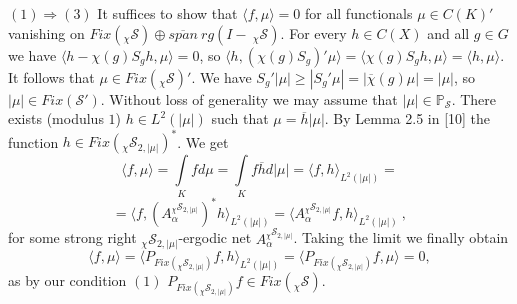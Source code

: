 \documentclass{amsart}
\theoremstyle{definition}
\theoremstyle{remark}
\numberwithin{equation}{section}
\newcommand{\bs}{\rightline{$\blacksquare$}}
\begin{document}
$(1) \Rightarrow (3)$ It suffices to show that $\langle f, \mu \rangle = 0 $ for all
functionals $\mu \in C(K)'$ vanishing on $Fix(_{\chi}\mathcal{S}) \oplus \overline{span}\ rg (I -\ _{\chi}\mathcal{S})$. For every $h \in C(X)$ and all $ g \in G$ we have
$\langle h - \chi(g)S_g h, \mu \rangle = 0$, so $\langle h, (\chi(g)S_g)'\mu \rangle = \langle \chi(g)S_g h, \mu \rangle = \langle h, \mu \rangle$. It follows that  $\mu \in Fix(_{\chi}\mathcal{S})'$. We have $S_g'|\mu| \geq |S_g'\mu| = |\overline{\chi}(g)\mu| = |\mu|$, so $|\mu| \in Fix(\mathcal{S}')$. Without loss of generality 
we may assume that $|\mu| \in \mathbb{P}_{\mathcal{S}}$. There exists (modulus $1$) $h \in L^2(|\mu|)$ 
such that $\mu = \overline{h}|\mu|$. By Lemma 2.5 in [10] the function $h \in Fix(_{\chi}\mathcal{S}_{2,|\mu|})^*$. We get
\[ \langle f, \mu \rangle = \int \limits_K f d\mu = \int \limits_K f \overline{h}d|\mu| = \langle f, h \rangle_{L^2(|\mu|)} = 
\]
\[ = \langle f, (A_{\alpha}^{_{\chi}\mathcal{S}_{2,|\mu|}} )^* h \rangle_{L^2(|\mu|)} = \langle A_{\alpha}^{_{\chi}\mathcal{S}_{2,|\mu|}} f, h \rangle_{L^2(|\mu|)}\ , \]
for some strong right $_{\chi}\mathcal{S}_{2, |\mu|}$-ergodic net $A_{\alpha}^{_{\chi}\mathcal{S}_{2,|\mu|}}$. 
Taking the limit we finally obtain 
$$ \langle f, \mu \rangle = \langle P_{Fix(_{\chi}\mathcal{S}_{2,|\mu|})}f , h \rangle_{L^2(|\mu|)} =  \langle P_{Fix(_{\chi}\mathcal{S}_{2,|\mu|})}f, \mu \rangle = 0,  
$$
as by our condition $(1)$ $P_{Fix(_{\chi}\mathcal{S}_{2,|\mu|})}f \in Fix(_{\chi}\mathcal{S})$.

\bs
\end{document}
